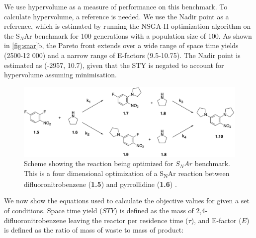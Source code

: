 

We use hypervolume as a measure of performance on this benchmark. To calculate hypervolume, a reference is needed. We use the Nadir point as a reference, which is estimated by running the NSGA-II optimization algorithm\cite{Deb2002} on the S$_N$Ar benchmark for 100 generations with a population size of 100. As shown in \ref{fig:snar}b, the Pareto front  extends over a wide range of space time yields (2500-12 000) and a narrow range of E-factors (9.5-10.75). The Nadir point is estimated as (-2957, 10.7), given that the STY is negated to account for hypervolume assuming minimisation.

\begin{figure}
    \centering
    \includegraphics[width=\textwidth]{gfx/Chapter03/snar_benchmark_scheme_thesis.png}
    \caption{Scheme showing the reaction being optimized for $S_NAr$ benchmark. This is a four dimensional optimization of a  S\textsubscript{N}Ar reaction between difluoronitrobenzene (\textbf{1.5}) and pyrrollidine (\textbf{1.6}) \cite{Hone2017}.}
    \label{fig:snar_benchmark}
\end{figure}

We now show the equations used to calculate the objective values for given a set of conditions. Space time yield ($STY$) is defined as the mass of 2,4-difluoronitrobenzene leaving the reactor per residence time ($\tau$), and E-factor ($E$) is defined as the ratio of mass of waste to mass of product:

